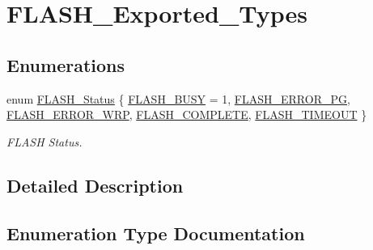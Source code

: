 \hypertarget{group___f_l_a_s_h___exported___types}{}\section{F\+L\+A\+S\+H\+\_\+\+Exported\+\_\+\+Types}
\label{group___f_l_a_s_h___exported___types}
\subsection*{Enumerations}
\begin{DoxyCompactItemize}
\item 
enum \mbox{\hyperlink{group___f_l_a_s_h___exported___types_gadc63a6f3404ff1f71229a66915e9cdc0}{F\+L\+A\+S\+H\+\_\+\+Status}} \{ \newline
\mbox{\hyperlink{group___f_l_a_s_h___exported___types_ggadc63a6f3404ff1f71229a66915e9cdc0aa25021d41842af8a68cefcb65949e099}{F\+L\+A\+S\+H\+\_\+\+B\+U\+SY}} = 1, 
\mbox{\hyperlink{group___f_l_a_s_h___exported___types_ggadc63a6f3404ff1f71229a66915e9cdc0adcb0c5002fc757739886a2601a3981da}{F\+L\+A\+S\+H\+\_\+\+E\+R\+R\+O\+R\+\_\+\+PG}}, 
\mbox{\hyperlink{group___f_l_a_s_h___exported___types_ggadc63a6f3404ff1f71229a66915e9cdc0ac9e2d95d3ba415fb7392d72a2458f4d8}{F\+L\+A\+S\+H\+\_\+\+E\+R\+R\+O\+R\+\_\+\+W\+RP}}, 
\mbox{\hyperlink{group___f_l_a_s_h___exported___types_ggadc63a6f3404ff1f71229a66915e9cdc0ab0e88e9f59edee379a1a710a8b7deebf}{F\+L\+A\+S\+H\+\_\+\+C\+O\+M\+P\+L\+E\+TE}}, 
\newline
\mbox{\hyperlink{group___f_l_a_s_h___exported___types_ggadc63a6f3404ff1f71229a66915e9cdc0a90c514b6a619e3a4e6c2eec3154323f8}{F\+L\+A\+S\+H\+\_\+\+T\+I\+M\+E\+O\+UT}}
 \}
\begin{DoxyCompactList}\small\item\em F\+L\+A\+SH Status. \end{DoxyCompactList}\end{DoxyCompactItemize}


\subsection{Detailed Description}


\subsection{Enumeration Type Documentation}
\mbox{\label{group___f_l_a_s_h___exported___types_gadc63a6f3404ff1f71229a66915e9cdc0}} 
